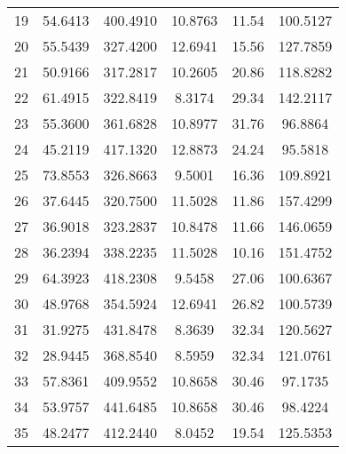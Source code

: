 \begin{center}
\begin{footnotesize}
\begin{tabular}{|c|ccccc|}
19 & 54.6413 & 400.4910 & 10.8763 & 11.54 & 100.5127 \\
20 & 55.5439 & 327.4200 & 12.6941 & 15.56 & 127.7859 \\
21 & 50.9166 & 317.2817 & 10.2605 & 20.86 & 118.8282 \\
22 & 61.4915 & 322.8419 & 8.3174 & 29.34 & 142.2117 \\
23 & 55.3600 & 361.6828 & 10.8977 & 31.76 & 96.8864 \\
24 & 45.2119 & 417.1320 & 12.8873 & 24.24 & 95.5818 \\
25 & 73.8553 & 326.8663 & 9.5001 & 16.36 & 109.8921 \\
26 & 37.6445 & 320.7500 & 11.5028 & 11.86 & 157.4299 \\
27 & 36.9018 & 323.2837 & 10.8478 & 11.66 & 146.0659 \\
28 & 36.2394 & 338.2235 & 11.5028 & 10.16 & 151.4752 \\
29 & 64.3923 & 418.2308 & 9.5458 & 27.06 & 100.6367 \\
30 & 48.9768 & 354.5924 & 12.6941 & 26.82 & 100.5739 \\
31 & 31.9275 & 431.8478 & 8.3639 & 32.34 & 120.5627 \\
32 & 28.9445 & 368.8540 & 8.5959 & 32.34 & 121.0761 \\
33 & 57.8361 & 409.9552 & 10.8658 & 30.46 & 97.1735 \\
34 & 53.9757 & 441.6485 & 10.8658 & 30.46 & 98.4224 \\
35 & 48.2477 & 412.2440 & 8.0452 & 19.54 & 125.5353 \\
\hline
\end{tabular}
\end{footnotesize}
\end{center}

